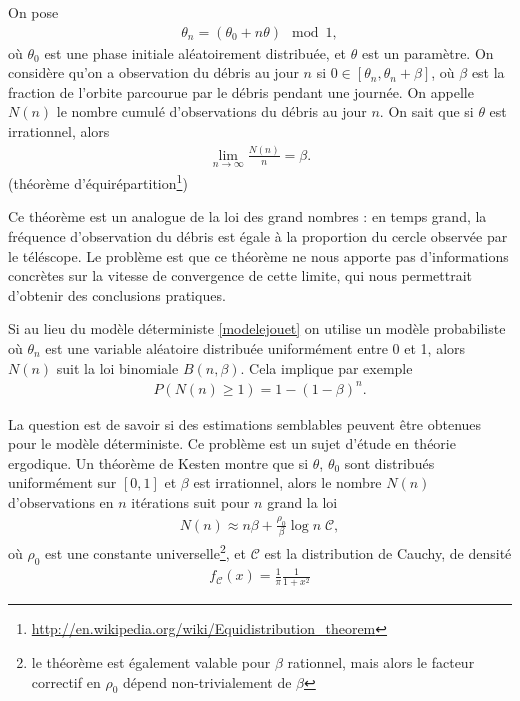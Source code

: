 \documentclass[a4paper,11pt]{article}
\numberwithin{section}{part}
\begin{document}
%   
%   
  

On pose
\begin{align}
  \label{modelejouet}
  \theta_{n} = (\theta_{0} + n \theta) \mod 1,
\end{align}
où $\theta_{0}$ est une phase initiale aléatoirement distribuée, et
$\theta$ est un paramètre. On considère qu'on a observation du débris
au jour $n$ si $0 \in [\theta_{n}, \theta_{n}+\beta]$, où $\beta$ est
la fraction de l'orbite parcourue par le débris pendant une
journée. On appelle $N(n)$ le nombre cumulé d'observations du débris
au jour $n$. On sait que si $\theta$ est irrationnel, alors
\begin{align}
  \label{largenumbers}
  \lim_{n\to\infty} \frac{N(n)} n = \beta.
\end{align}
(théorème d'équirépartition\footnote{\url{http://en.wikipedia.org/wiki/Equidistribution_theorem}})

Ce théorème est un analogue de la loi des grand nombres : en temps
grand, la fréquence d'observation du débris est égale à la proportion
du cercle observée par le téléscope. Le problème est que ce théorème
ne nous apporte pas d'informations concrètes sur la vitesse de
convergence de cette limite, qui nous permettrait d'obtenir des
conclusions pratiques. 

Si au lieu du modèle déterministe \eqref{modelejouet} on utilise un
modèle probabiliste où $\theta_{n}$ est une variable aléatoire
distribuée uniformément entre 0 et 1, alors $N(n)$ suit la loi
binomiale $B(n,\beta)$. Cela implique par exemple
\begin{align}
  P(N(n) \geq 1) = 1 - (1-\beta)^{n}.
\end{align}

La question est de savoir si des estimations semblables peuvent être
obtenues pour le modèle déterministe. Ce problème est un sujet d'étude
en théorie ergodique. Un théorème de Kesten\cite{kesten} montre que si
$\theta$, $\theta_{0}$ sont distribués uniformément sur $[0,1]$ et
$\beta$ est irrationnel, alors le nombre $N(n)$ d'observations en $n$
itérations suit pour $n$ grand la loi
\begin{align}
  N(n) \approx n \beta + \frac {\rho_{0}}\beta \log n\; \mathcal C,
\end{align}
où $\rho_{0}$ est une constante universelle\footnote{le théorème est également
valable pour $\beta$ rationnel, mais alors le facteur correctif en
$\rho_{0}$ dépend non-trivialement de $\beta$}, et $\mathcal C$ est
la distribution de Cauchy, de densité
\begin{align}
  f_{\mathcal C}(x) = \frac 1 \pi \frac 1 {1+x^{2}}
\end{align}
\end{document}

